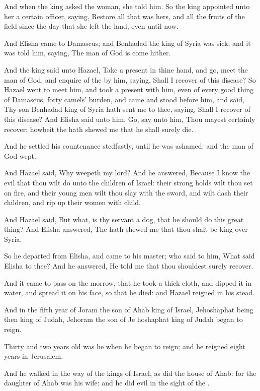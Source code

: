\verse And when the king asked the woman, she told him. So the king appointed unto her a certain officer, saying, Restore all that was hers, and all the fruits of the field since the day that she left the land, even until now.

\verse And Elisha came to Damascus; and Benhadad the king of Syria was sick; and it was told him, saying, The man of God is come hither.

\verse And the king said unto Hazael, Take a present in thine hand, and go, meet the man of God, and enquire of the \LORD by him, saying, Shall I recover of this disease?  \verse So Hazael went to meet him, and took a present with him, even of every good thing of Damascus, forty camels' burden, and came and stood before him, and said, Thy son Benhadad king of Syria hath sent me to thee, saying, Shall I recover of this disease?  \verse And Elisha said unto him, Go, say unto him, Thou mayest certainly recover: howbeit the \LORD hath shewed me that he shall surely die.

\verse And he settled his countenance stedfastly, until he was ashamed: and the man of God wept.

\verse And Hazael said, Why weepeth my lord? And he answered, Because I know the evil that thou wilt do unto the children of Israel: their strong holds wilt thou set on fire, and their young men wilt thou slay with the sword, and wilt dash their children, and rip up their women with child.

\verse And Hazael said, But what, is thy servant a dog, that he should do this great thing? And Elisha answered, The \LORD hath shewed me that thou shalt be king over Syria.

\verse So he departed from Elisha, and came to his master; who said to him, What said Elisha to thee? And he answered, He told me that thou shouldest surely recover.

\verse And it came to pass on the morrow, that he took a thick cloth, and dipped it in water, and spread it on his face, so that he died: and Hazael reigned in his stead.

\verse And in the fifth year of Joram the son of Ahab king of Israel, Jehoshaphat being then king of Judah, Jehoram the son of Je hoshaphat king of Judah began to reign.

\verse Thirty and two years old was he when he began to reign; and he reigned eight years in Jerusalem.

\verse And he walked in the way of the kings of Israel, as did the house of Ahab: for the daughter of Ahab was his wife: and he did evil in the sight of the \LORD.

